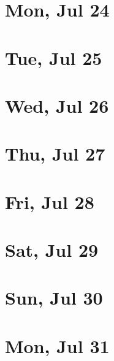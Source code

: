 	\section{Mon, Jul 24}
		
	\section{Tue, Jul 25}
		
	\section{Wed, Jul 26}
		
	\section{Thu, Jul 27}
		
	\section{Fri, Jul 28}
		
	\section{Sat, Jul 29}
		
	\section{Sun, Jul 30}
		
	\section{Mon, Jul 31}
		
